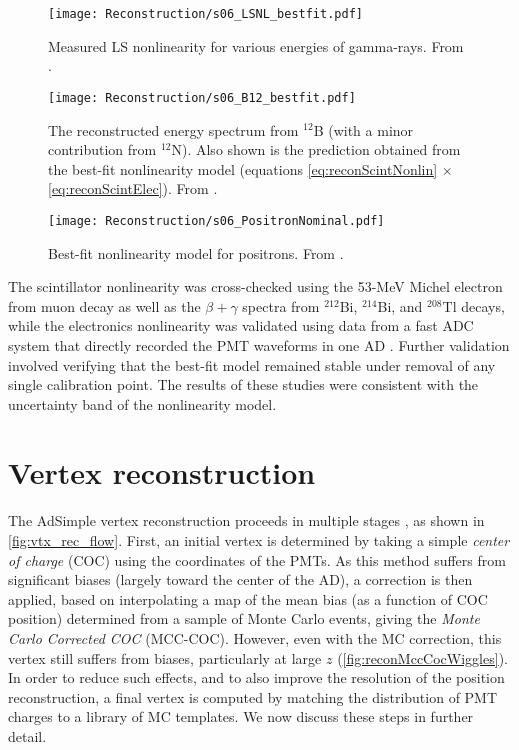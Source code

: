 \documentclass[../thesis.tex]{subfiles}
\begin{document}
\begin{figure}[h]
  \texttt{[image: Reconstruction/s06\_LSNL\_bestfit.pdf]}
  \caption{Measured LS nonlinearity for various energies of gamma-rays. From \cite{NonlinearityPaper}.}
  \label{fig:reconGammaLines}
\end{figure}

\begin{figure}[h]
  \texttt{[image: Reconstruction/s06\_B12\_bestfit.pdf]}
  \caption{The reconstructed energy spectrum from $^{12}$B (with a minor contribution from $^{12}$N). Also shown is the prediction obtained from the best-fit nonlinearity model (equations \autoref{eq:reconScintNonlin} $\times$ \autoref{eq:reconScintElec}). From \cite{NonlinearityPaper}.}
  \label{fig:reconB12}
\end{figure}

\begin{figure}[h]
  \texttt{[image: Reconstruction/s06\_PositronNominal.pdf]}
  \caption{Best-fit nonlinearity model for positrons. From \cite{NonlinearityPaper}.}
  \label{fig:reconPositronNominal}
\end{figure}

The scintillator nonlinearity was cross-checked using the 53-MeV Michel electron from muon decay as well as the $\beta+\gamma$ spectra from $^{212}$Bi, $^{214}$Bi, and $^{208}$Tl decays, while the electronics nonlinearity was validated using data from a fast ADC system that directly recorded the PMT waveforms in one AD \cite{HUANG201848}. Further validation involved verifying that the best-fit model remained stable under removal of any single calibration point. The results of these studies were consistent with the uncertainty band of the nonlinearity model.

\section{Vertex reconstruction}
\label{chap:reconVertex}

The AdSimple vertex reconstruction proceeds in multiple stages \cite{adsimple1,adsimple2}, as shown in \autoref{fig:vtx_rec_flow}. First, an initial vertex is determined by taking a simple \emph{center of charge} (COC) using the coordinates of the PMTs. As this method suffers from significant biases (largely toward the center of the AD), a correction is then applied, based on interpolating a map of the mean bias (as a function of COC position) determined from a sample of Monte Carlo events, giving the \emph{Monte Carlo Corrected COC} (MCC-COC). However, even with the MC correction, this vertex still suffers from biases, particularly at large $z$ (\autoref{fig:reconMccCocWiggles}). In order to reduce such effects, and to also improve the resolution of the position reconstruction, a final vertex is computed by matching the distribution of PMT charges to a library of MC templates. We now discuss these steps in further detail. 
\end{document}
